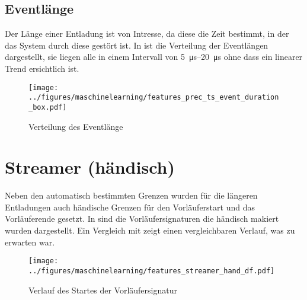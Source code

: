 \subsection{Eventlänge}
Der Länge einer Entladung ist von Intresse, da diese die Zeit bestimmt, in der das System durch diese gestört ist. In  ist die Verteilung der Eventlängen dargestellt, sie liegen alle in einem Intervall von \SIrange{5}{20}{\micro\second} ohne dass ein linearer Trend ersichtlich ist.

\begin{figure}[htbp]
    \centering
      \texttt{[image: ../figures/maschinelearning/features\_prec\_ts\_event\_duration\_box.pdf]}
      \caption{Verteilung des Eventlänge}
      \label{fig:prec_ts_event_duration_box}
\end{figure}

\begin{table}[h!]
\centering
\caption{Model Performance für die Vorhersage der Eventlänge}
\end{table}




\section{Streamer (händisch)}
Neben den automatisch bestimmten Grenzen wurden für die längeren Entladungen auch händische Grenzen für den Vorläuferstart und das Vorläuferende gesetzt. In  sind die Vorläufersignaturen die händisch makiert wurden dargestellt. Ein Vergleich mit  zeigt einen vergleichbaren Verlauf, was zu erwarten war.

\begin{figure}[htbp]
    \centering
      \texttt{[image: ../figures/maschinelearning/features\_streamer\_hand\_df.pdf]}
      \caption{Verlauf des Startes der Vorläufersignatur}
      \label{fig:streamer_current_sliece}
\end{figure}


